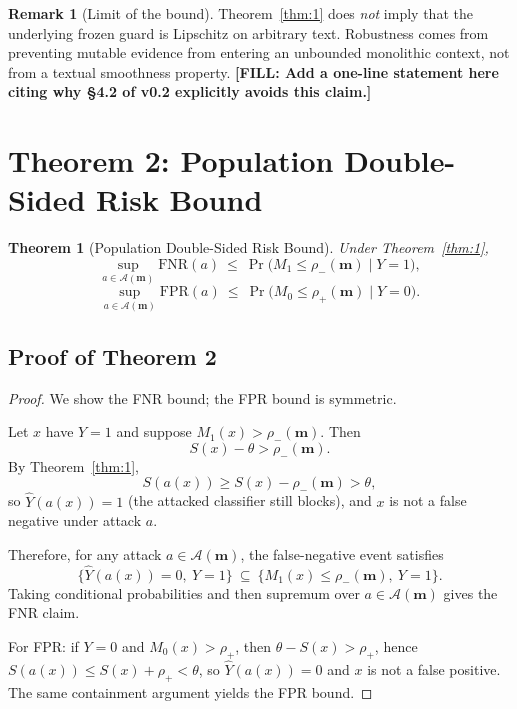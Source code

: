 \documentclass[11pt]{article}
\newcommand{\TODO}[1]{{\color{red}\textbf{[FILL: #1]}}}
\theoremstyle{plain}
\newtheorem{theorem}{Theorem}
\theoremstyle{definition}
\newtheorem{remark}{Remark}
\begin{document}
\begin{remark}[Limit of the bound]
Theorem~\ref{thm:1} does \emph{not} imply that the underlying frozen guard is Lipschitz on arbitrary text.
Robustness comes from preventing mutable evidence from entering an unbounded monolithic context,
not from a textual smoothness property. \TODO{Add a one-line statement here citing why \S 4.2 of v0.2 explicitly avoids this claim.}
\end{remark}

\section{Theorem 2: Population Double-Sided Risk Bound}

\begin{theorem}[Population Double-Sided Risk Bound]\label{thm:2}
Under Theorem~\ref{thm:1},
\[
\sup_{a \in \mathcal A(\mathbf m)} \mathrm{FNR}(a)
   \ \le\ \Pr\!\big(M_1 \le \rho_-(\mathbf m) \mid Y = 1\big),
\]
\[
\sup_{a \in \mathcal A(\mathbf m)} \mathrm{FPR}(a)
   \ \le\ \Pr\!\big(M_0 \le \rho_+(\mathbf m) \mid Y = 0\big).
\]
\end{theorem}

\subsection{Proof of Theorem 2}

\begin{proof}
We show the FNR bound; the FPR bound is symmetric.

Let $x$ have $Y = 1$ and suppose $M_1(x) > \rho_-(\mathbf m)$. Then
\[
S(x) - \theta > \rho_-(\mathbf m).
\]
By Theorem~\ref{thm:1},
\[
S(a(x)) \ge S(x) - \rho_-(\mathbf m) > \theta,
\]
so $\hat Y(a(x)) = 1$ (the attacked classifier still blocks), and $x$ is not a false negative under attack $a$.

Therefore, for any attack $a \in \mathcal A(\mathbf m)$, the false-negative event satisfies
\[
\big\{\hat Y(a(x)) = 0,\ Y = 1\big\} \ \subseteq\ \big\{M_1(x) \le \rho_-(\mathbf m),\ Y = 1\big\}.
\]
Taking conditional probabilities and then supremum over $a \in \mathcal A(\mathbf m)$ gives the FNR claim.

For FPR: if $Y = 0$ and $M_0(x) > \rho_+$, then $\theta - S(x) > \rho_+$, hence
$S(a(x)) \le S(x) + \rho_+ < \theta$, so $\hat Y(a(x)) = 0$ and $x$ is not a false positive.
The same containment argument yields the FPR bound.
\end{proof}
\end{document}
